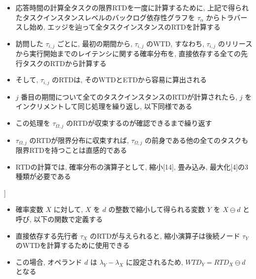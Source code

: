 \begin{frame}{}
    \begin{itemize}
        \item 応答時間の計算全タスクの限界RTDを一度に計算するために, 上記で得られたタスクインスタンスレベルのバックログ依存性グラフを $\tau_{\alpha}$ からトラバースし始め, エッジを辿って全タスクインスタンスのRTDを計算する
\item 訪問した $\tau_{i, j}$ ごとに, 最初の期間から, $\tau_{i, j}$ のWTD, すなわち, $\tau_{i, j}$ のリリースから実行開始までのレイテンシに関する確率分布を, 直接依存する全ての先行タスクのRTDから計算する
\item そして, $\tau_{i, j}$ のRTDは, そのWTDとETDから容易に算出される
\item $j$ 番目の期間について全てのタスクインスタンスのRTDが計算されたら, $j$ をインクリメントして同じ処理を繰り返し, 以下同様である
\item この処理を $\tau_{\Omega, j}$ のRTDが収束するのが確認できるまで繰り返す
\item $\tau_{\Omega, j}$ のRTDが限界分布に収束すれば, $\tau_{\Omega, j}$ の前身である他の全てのタスクも限界RTDを持つことは直感的である
    \end{itemize}
\end{frame}

\begin{frame}{}
    \begin{itemize}
        \item RTDの計算では, 確率分布の演算子として, 縮小[14], 畳み込み, 最大化[4]の3種類が必要である
    \end{itemize}
\end{frame}

\begin{frame}{}
    \begin{definition}[シュリンキング [14]]
        \setlength{\linewidth}{0.98\columnwidth}
        \begin{itemize}
            \item 確率変数 $X$ に対して, $X$ を $d$ の整数で縮小して得られる変数 $Y$ を $X \ominus d$ と呼び, 以下の関数で定義する
\item 直接依存する先行者 $\tau_{X}$ のRTDが与えられると, 縮小演算子は後続ノード $\tau_{Y}$ のWTDを計算するために使用できる
\item この場合, オペランド $d$ は $\lambda_{Y}-\lambda_{X}$ に設定されるため, $W T D_{Y}=R T D_{X} \ominus d$ となる
        \end{itemize}
    \end{definition}
\end{frame}


